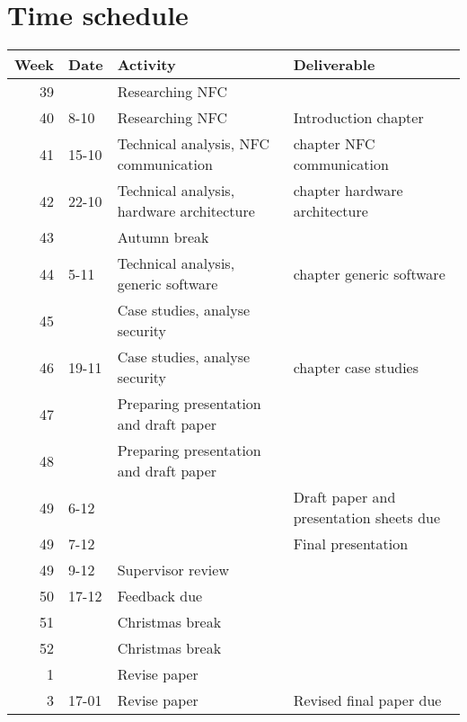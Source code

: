 \documentclass[11pt]{article} %
\begin{document}
\newpage
\section{Time schedule}
\begin{center}
  \begin{tabular}{ | r | l | l || l | }
    \hline
    Week & Date & Activity & Deliverable \\ \hline
    39 &  & Researching NFC &  \\ \hline
    40 & 8-10 & Researching NFC & Introduction chapter \\ \hline
    41 & 15-10 & Technical analysis, NFC communication & chapter NFC communication \\ \hline
    42 & 22-10 & Technical analysis, hardware architecture & chapter hardware architecture \\ \hline
    43 & & Autumn break & \\ \hline
    44 & 5-11 & Technical analysis, generic software & chapter generic software \\ \hline
    45 & & Case studies, analyse security & \\ \hline
    46 & 19-11 & Case studies, analyse security & chapter case studies\\ \hline
    47 & & Preparing presentation and draft paper & \\ \hline
    48 & & Preparing presentation and draft paper & \\ \hline
    49 & 6-12 & & Draft paper and presentation sheets due \\ \hline
    49 & 7-12 & & Final presentation  \\ \hline
    49 & 9-12 & Supervisor review & \\ \hline
    50 & 17-12 & Feedback due & \\ \hline
    51 & & Christmas break & \\ \hline
    52 & & Christmas break & \\ \hline
    1 & & Revise paper & \\ \hline
    3 & 17-01 & Revise paper & Revised final paper due \\ \hline
  \end{tabular}
\end{center}



\end{document}
